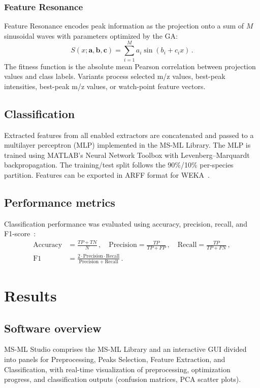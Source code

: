 \documentclass[preprint,12pt]{elsarticle}
\begin{document}
\subsubsection{Feature Resonance}
Feature Resonance encodes peak information as the projection onto a sum of $M$ sinusoidal waves with parameters optimized by the GA:
\begin{equation}
S(x; \mathbf{a}, \mathbf{b}, \mathbf{c}) = \sum_{i=1}^{M} a_i \sin(b_i + c_i x)\,.
\label{eq:resonance}
\end{equation}
The fitness function is the absolute mean Pearson correlation between projection values and class labels. Variants process selected m/z values, best-peak intensities, best-peak m/z values, or watch-point feature vectors.

\subsection{Classification}
Extracted features from all enabled extractors are concatenated and passed to a multilayer perceptron (MLP) implemented in the MS-ML Library. The MLP is trained using MATLAB's Neural Network Toolbox with Levenberg--Marquardt backpropagation. The training/test split follows the 90\%/10\% per-species partition. Features can be exported in ARFF format for WEKA~\cite{Powers2011}.

\subsection{Performance metrics}
Classification performance was evaluated using accuracy, precision, recall, and F1-score~\cite{Powers2011}:
\begin{align}
\mathrm{Accuracy} &= \frac{TP + TN}{N}\,,\quad
\mathrm{Precision} = \frac{TP}{TP + FP}\,,\quad
\mathrm{Recall} = \frac{TP}{TP + FN}\,, \\
\mathrm{F1} &= \frac{2 \cdot \mathrm{Precision} \cdot \mathrm{Recall}}{\mathrm{Precision} + \mathrm{Recall}}\,.
\end{align}

\section{Results}
\label{sec:results}

\subsection{Software overview}
MS-ML Studio comprises the MS-ML Library and an interactive GUI divided into panels for Preprocessing, Peaks Selection, Feature Extraction, and Classification, with real-time visualization of preprocessing, optimization progress, and classification outputs (confusion matrices, PCA scatter plots).
\end{document}
